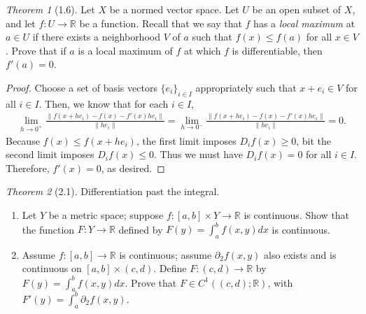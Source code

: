 \documentclass[12pt]{article}
\theoremstyle{remark}
\theoremstyle{named}
\newtheorem*{theorem}{Theorem}
\newcommand{\R}{\mathbb R}
\begin{document}
\begin{theorem}[1.6]
    Let \(X\) be a normed vector space. Let \(U\) be an open subset of \(X\), and let \(f : U \to \R\) be a function. Recall that we say that \(f\) has a \textit{local maximum} at \(a \in U\) if there exists a neighborhood \(V\) of \(a\) such that \(f(x) \leq f(a)\) for all \(x \in V\). Prove that if \(a\) is a local maximum of \(f\) at which \(f\) is differentiable, then \(f'(a) = 0\). 
\end{theorem}

\begin{proof}
    Choose a set of basis vectors \(\{e_i\}_{i \in I}\) appropriately such that \(x + e_i \in V\) for all \(i \in I\). Then, we know that for each \(i \in I\),
    \begin{align*}
        \lim_{h \to 0^+} \frac{\|f(x + h e_i) - f(x) - f'(x)h e_i\|}{\|h e_i\|} = \lim_{h \to 0^-} \frac{\|f(x + h e_i) - f(x) - f'(x)h e_i\|}{\|h e_i\|} = 0.
    \end{align*}
    Because \(f(x) \leq f(x + h e_i)\), the first limit imposes \(D_i f(x) \geq 0\), bit the second limit imposes \(D_i f(x) \leq 0\). Thus we must have \(D_i f(x) = 0\) for all \(i \in I\). Therefore, \(f'(x) = 0\), as desired.
\end{proof}

\begin{theorem}[2.1]
    Differentiation past the integral.
    \begin{enumerate}
        \item Let \(Y\) be a metric space; suppose \(f : [a, b] \times Y \to \R\) is continuous. Show that the function \(F : Y \to \R\) defined by \(F(y) = \int_{a}^{b} f(x, y) dx\) is continuous.
        \item Assume \(f : [a, b] \to \R\) is continuous; assume \(\partial_2 f(x, y)\) also exists and is continuous on \([a, b] \times (c, d)\). Define \(F : (c, d) \to \R\) by \(F(y) = \int_{a}^{b} f(x, y) dx\). Prove that \(F \in C^1((c, d);\R)\), with \(F'(y) = \int_{a}^{b} \partial_2 f(x, y)\). 
    \end{enumerate}
\end{theorem}
\end{document}
